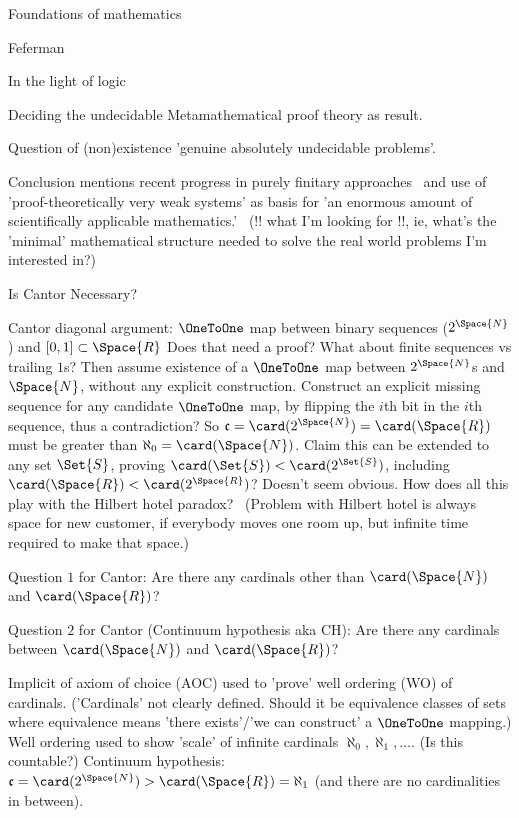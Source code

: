 \begin{plSection}{Foundations of mathematics}
\begin{plSection}{Feferman}
\begin{plSection}{In the light of logic}
\begin{plSection}{Deciding the undecidable}
Metamathematical proof theory as result.

Question of (non)existence 
'genuine absolutely undecidable problems'.

Conclusion mentions recent progress
in purely finitary approaches~\cite[ch.~10]{Feferman:1998:LightOfLogic}
and 
use of 'proof-theoretically very weak systems'
as basis for 'an enormous amount of scientifically applicable
mathematics.'~\cite[ch.~14]{Feferman:1998:LightOfLogic}
(!! what I'm looking for !!, ie, 
what's the 'minimal' mathematical structure needed to
solve the real world problems I'm interested in?)

\end{plSection}%
\begin{plSection}{Is Cantor Necessary?}
\label{sec:Is_Cantor_Necessary}

\cite{Feferman:1989:IsCantorNecessary}
\cite[ch.~2 ``Is Cantor necessary?'']{Feferman:1998:LightOfLogic}

Cantor diagonal argument:
\hfill\break
$\OneToOne$ map between binary sequences ($2^{\Space{N}}$)
and $[0,1]\subset\Space{R}$
Does that need a proof?
What about finite sequences vs trailing $1$s? 
\hfill\break
Then assume existence of a $\OneToOne$  
map between $2^{\Space{N}}$s 
and $\Space{N}$,
without any explicit construction.
Construct an explicit missing sequence 
for any candidate $\OneToOne$ map,
by flipping the $i$th bit in the $i$th sequence,
thus a contradiction?
So $\mathfrak{c} = \card(2^{\Space{N}}) 
= \card(\Space{R})$ must be greater than 
$\aleph_0 = \card(\Space{N})$. 
\hfill\break
Claim this can be extended to any set $\Set{S}$,
proving 
$\card(\Set{S}) < \card(2^{\Set{S}})$,
including 
$\card(\Space{R}) < \card(2^{\Space{R}})$?
Doesn't seem obvious.
\hfill\break
How does all this play with 
the Hilbert hotel paradox?~\cite{wiki:HilbertHotel}
(Problem with Hilbert hotel is 
always space for new customer, if everybody moves one room up,
but infinite time required to make that space.)

Question $1$ for Cantor:
\hfill\break
Are there any cardinals other than 
$\card(\Space{N})$ and 
$\card(\Space{R})$?

Question $2$ for Cantor (Continuum hypothesis aka CH):
\hfill\break
Are there any cardinals between
$\card(\Space{N})$ and 
$\card(\Space{R})$?

Implicit of axiom of choice (AOC) used to 'prove' 
well ordering (WO) of cardinals.
('Cardinals' not clearly defined.
Should it be equivalence classes of sets where
equivalence means 'there exists'/'we can construct'
a $\OneToOne$ mapping.)
\hfill\break
Well ordering used to show 'scale' of infinite cardinals
$\aleph_0, \aleph_1, \ldots$. (Is this countable?)
\hfill\break
Continuum hypothesis: 
$\mathfrak{c} = \card(2^{\Space{N}}) 
> \card(\Space{R}) = \aleph_1$
(and there are no cardinalities in between).


\end{plSection}
\end{plSection}
\end{plSection}
\end{plSection}
